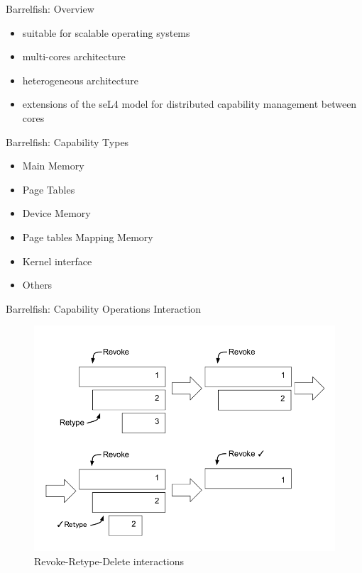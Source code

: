 \documentclass[11pt]{beamer}
\begin{document}
\begin{frame}{Barrelfish: Overview}
	\begin{itemize}

	\item suitable for scalable operating systems 
		\vfill
	\item multi-cores architecture
		\vfill
	\item heterogeneous architecture
		\vfill
	\item extensions of the seL4 model for distributed capability management between cores
	\end{itemize}
\end{frame}


\begin{frame}{Barrelfish: Capability Types}
\begin{itemize}
\item Main Memory
\vfill
\item Page Tables 
\vfill
\item Device Memory
\vfill
\item Page tables Mapping Memory 
\vfill
\item Kernel interface
\vfill
\item Others
\end{itemize}
\end{frame}


\begin{frame}{Barrelfish: Capability Operations Interaction}
\begin{figure}
		  \includegraphics[scale=0.25]{img/BF_revoke_retype}
		  \caption{Revoke-Retype-Delete interactions}
		  
    \end{figure}   
\end{frame}
\end{document}
